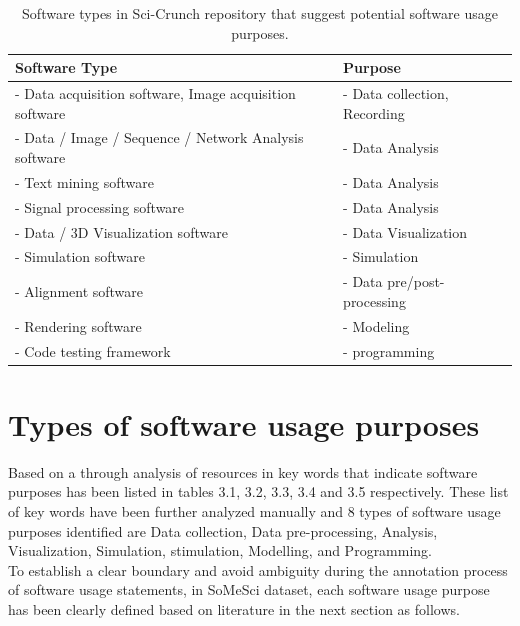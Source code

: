 \begin{table}[h!]
	\begin{center}
		\caption{Software types in Sci-Crunch repository that suggest potential software usage purposes.}
		\label{tab:table1}
		\begin{tabular}{|l|l|} %
			\hline
			\textbf{Software Type} & \textbf{Purpose} \\
			\hline
			- Data acquisition software, Image acquisition software  & - Data collection, Recording  \\
			\hline
			- Data / Image  / Sequence  / Network  Analysis software  & - Data Analysis  \\
			\hline
			- Text mining software  & - Data Analysis  \\
			\hline
			- Signal processing software  & - Data Analysis  \\
			\hline
			- Data / 3D Visualization software & - Data Visualization  \\
			\hline
			- Simulation software  & - Simulation  \\
			\hline
			- Alignment software  & - Data pre/post-processing \\
			\hline
			- Rendering software  & - Modeling  \\
			\hline
			-	Code testing framework   & - programming  \\
			\hline
		\end{tabular}
	\end{center}
\end{table}


\section{Types of software usage purposes }
\label{sec:purpose:Types}

Based on a through analysis of resources in key words that indicate software purposes has been listed in tables 3.1, 3.2, 3.3, 3.4 and 3.5 respectively. These list of key words have been further analyzed manually and 8 types of software usage purposes identified are Data collection,  Data pre-processing, Analysis, Visualization, Simulation, stimulation, Modelling, and Programming. \\

To establish a clear boundary and avoid ambiguity during the annotation process of software usage statements, in \ac{SoMeSci} dataset, each software usage purpose has been clearly defined based on literature in the next section as follows. 


